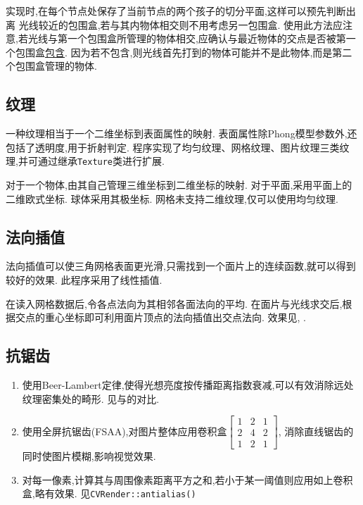 实现时,在每个节点处保存了当前节点的两个孩子的切分平面,这样可以预先判断出离
光线较近的包围盒,若与其内物体相交则不用考虑另一包围盒.
使用此方法应注意,若光线与第一个包围盒所管理的物体相交,应确认与最近物体的交点是否被第一个包围盒\underline{包含}.
因为若不包含,则光线首先打到的物体可能并不是此物体,而是第二个包围盒管理的物体.

\subsection{纹理}
一种纹理相当于一个二维坐标到表面属性的映射.
表面属性除Phong模型参数外,还包括了透明度,用于折射判定.
程序实现了均匀纹理、网格纹理、图片纹理三类纹理,并可通过继承\verb|Texture|类进行扩展.

对于一个物体,由其自己管理三维坐标到二维坐标的映射.
对于平面,采用平面上的二维欧式坐标. 球体采用其极坐标.
网格未支持二维纹理,仅可以使用均匀纹理.

\subsection{法向插值}
\label{sec:smooth}
法向插值可以使三角网格表面更光滑,只需找到一个面片上的连续函数,就可以得到较好的效果.
此程序采用了线性插值.

在读入网格数据后,令各点法向为其相邻各面法向的平均.
在面片与光线求交后,根据交点的重心坐标即可利用面片顶点的法向插值出交点法向.
效果见, .

\subsection{抗锯齿}
\begin{enumerate}
  \item 使用Beer-Lambert定律\cite{beer},使得光想亮度按传播距离指数衰减,可以有效消除远处纹理密集处的畸形.
    见与的对比.

  \item 使用全屏抗锯齿(FSAA),对图片整体应用卷积盒$\begin{bmatrix}1 & 2 & 1\\2 & 4 & 2\\1 & 2 & 1\end{bmatrix} $,
    消除直线锯齿的同时使图片模糊,影响视觉效果.

  \item 对每一像素,计算其与周围像素距离平方之和,若小于某一阈值则应用如上卷积盒,略有效果. 见\verb|CVRender::antialias()|
\end{enumerate}


